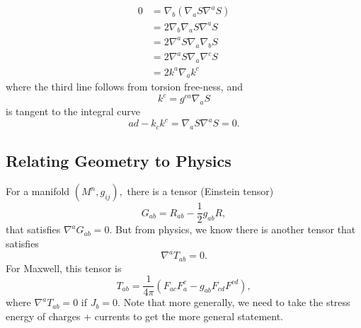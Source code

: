 \documentclass{article}
\numberwithin{equation}{section}
\begin{document}
\begin{align*}
    0 &= \nabla_b(\nabla_a S\nabla^a S) \\ 
    &= 2\nabla_b\nabla_a S \nabla^a S \\ 
    &= 2\nabla^a S\nabla_a\nabla_b S \\ 
    &= 2\nabla^a S\nabla_a\nabla^c S \\ 
    &= 2k^a\nabla_a k^c
\end{align*}
where the third line follows from torsion free-ness, and 
\begin{equation*}
    k^c = g^{ca}\nabla_a S
\end{equation*}
is tangent to the integral curve
\begin{equation*}
    ad - k_ck^c = \nabla_a S\nabla^a S = 0.
\end{equation*} 
\subsection{Relating Geometry to Physics}
For a manifold $(M^n,g_{ij}),$ there is a tensor (Einstein tensor)
\begin{equation*}
    G_{ab} = R_{ab} - \frac{1}{2}g_{ab}R,
\end{equation*}
that satisfies $\nabla^a G_{ab} = 0.$ But from physics, we know there is another tensor that satisfies 
\begin{equation*}
    \nabla^a T_{ab} = 0.
\end{equation*}
For Maxwell, this tensor is 
\begin{equation*}
    T_{ab} = \frac{1}{4\pi} \left(F_{ac}F^{c}_{a} - g_{ab} F_{cd}F^{cd}\right),
\end{equation*}
where $\nabla^a T_{ab}=0$ if $J_b=0.$ Note that more generally, we need to take the stress energy of charges + currents to get the more general statement.
\end{document}
